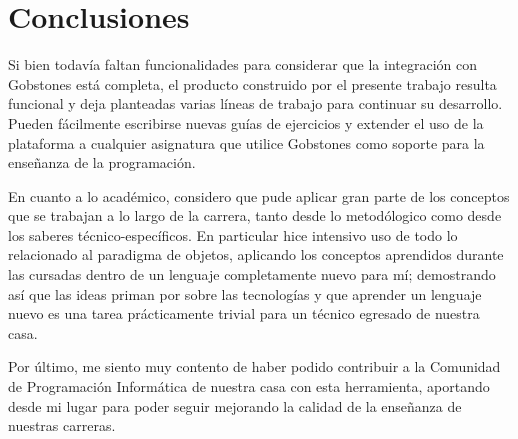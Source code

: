 
\section{Conclusiones}
Si bien todavía faltan funcionalidades para considerar que la integración con Gobstones está completa, el producto construido por el presente trabajo resulta funcional y deja planteadas varias líneas de trabajo para continuar su desarrollo. Pueden fácilmente escribirse nuevas guías de ejercicios y extender el uso de la plataforma a cualquier asignatura que utilice Gobstones como soporte para la enseñanza de la programación.

En cuanto a lo académico, considero que pude aplicar gran parte de los conceptos que se trabajan a lo largo de la carrera, tanto desde lo metodólogico como desde los saberes técnico-específicos. En particular hice intensivo uso de todo lo relacionado al paradigma de objetos, aplicando los conceptos aprendidos durante las cursadas dentro de un lenguaje completamente nuevo para mí; demostrando así que las ideas priman por sobre las tecnologías y que aprender un lenguaje nuevo es una tarea prácticamente trivial para un técnico egresado de nuestra casa.

Por último, me siento muy contento de haber podido contribuir a la Comunidad de Programación Informática de nuestra casa con esta herramienta, aportando desde mi lugar para poder seguir mejorando la calidad de la enseñanza de nuestras carreras.
